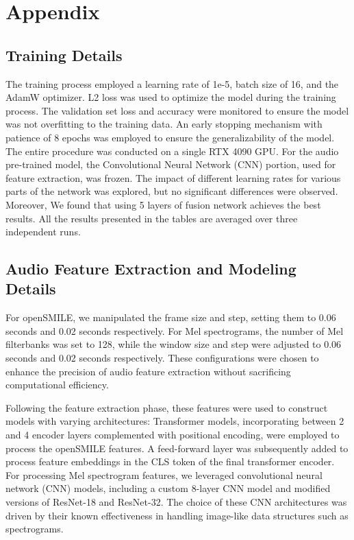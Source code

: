 \documentclass[11pt]{article}
\begin{document}



\clearpage
\appendix

\section{Appendix}
\label{sec:appendix}

\subsection{Training Details}
The training process employed a learning rate of 1e-5, batch size of 16, and the AdamW optimizer. L2 loss was used to optimize the model during the training process. The validation set loss and accuracy were monitored to ensure the model was not overfitting to the training data. An early stopping mechanism with patience of 8 epochs was employed to ensure the generalizability of the model. The entire procedure was conducted on a single RTX 4090 GPU.
For the audio pre-trained model, the Convolutional Neural Network (CNN) portion, used for feature extraction, was frozen. The impact of different learning rates for various parts of the network was explored, but no significant differences were observed. Moreover, We found that using 5 layers of fusion network achieves the best results.
All the results presented in the tables are averaged over three independent runs.
\subsection{Audio Feature Extraction and Modeling Details}
For openSMILE, we manipulated the frame size and step, setting them to 0.06 seconds and 0.02 seconds respectively. For Mel spectrograms, the number of Mel filterbanks was set to 128, while the window size and step were adjusted to 0.06 seconds and 0.02 seconds respectively. These configurations were chosen to enhance the precision of audio feature extraction without sacrificing computational efficiency.

Following the feature extraction phase, these features were used to construct models with varying architectures: Transformer models, incorporating between 2 and 4 encoder layers complemented with positional encoding, were employed to process the openSMILE features. A feed-forward layer was subsequently added to process feature embeddings in the CLS token of the final transformer encoder. For processing Mel spectrogram features, we leveraged convolutional neural network (CNN) models, including a custom 8-layer CNN model and modified versions of ResNet-18 and ResNet-32. The choice of these CNN architectures was driven by their known effectiveness in handling image-like data structures such as spectrograms.
\end{document}
